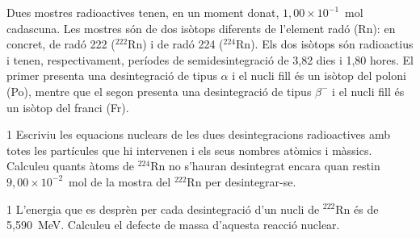Dues mostres radioactives tenen, en un moment donat, $1,00\times 10^{-1}$~mol cadascuna. Les mostres són de dos isòtops diferents de l'element radó (Rn): en concret, de radó 222 ($^{222}$Rn) i de radó 224 ($^{224}$Rn). Els dos isòtops són radioactius i tenen, respectivament, períodes de semidesintegració de 3,82 dies i 1,80 hores. El primer presenta una desintegració de tipus $\alpha$ i el nucli fill és un isòtop del poloni (Po), mentre que el segon presenta una desintegració de tipus $\beta^-$ i el nucli fill és un isòtop del franci (Fr).

\begin{apartat}{1}
Escriviu les equacions nuclears de les dues desintegracions radioactives amb totes les partícules que hi intervenen i els seus nombres atòmics i màssics. Calculeu quants àtoms de $^{224}$Rn no s'hauran desintegrat encara quan restin $9,00\times 10^{-2}$~mol de la mostra del $^{222}$Rn per desintegrar-se.
\end{apartat}

\begin{apartat}{1}
L'energia que es desprèn per cada desintegració d'un nucli de $^{222}$Rn és de 5,590~MeV. Calculeu el defecte de massa d'aquesta reacció nuclear.
\end{apartat}

